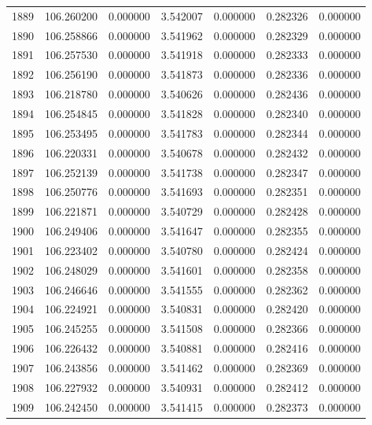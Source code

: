 \begin{tabular}{rrrrrrr}
1889 & 106.260200 &    0.000000 &  3.542007 &    0.000000 &    0.282326 &  0.000000 \\
1890 & 106.258866 &    0.000000 &  3.541962 &    0.000000 &    0.282329 &  0.000000 \\
1891 & 106.257530 &    0.000000 &  3.541918 &    0.000000 &    0.282333 &  0.000000 \\
1892 & 106.256190 &    0.000000 &  3.541873 &    0.000000 &    0.282336 &  0.000000 \\
1893 & 106.218780 &    0.000000 &  3.540626 &    0.000000 &    0.282436 &  0.000000 \\
1894 & 106.254845 &    0.000000 &  3.541828 &    0.000000 &    0.282340 &  0.000000 \\
1895 & 106.253495 &    0.000000 &  3.541783 &    0.000000 &    0.282344 &  0.000000 \\
1896 & 106.220331 &    0.000000 &  3.540678 &    0.000000 &    0.282432 &  0.000000 \\
1897 & 106.252139 &    0.000000 &  3.541738 &    0.000000 &    0.282347 &  0.000000 \\
1898 & 106.250776 &    0.000000 &  3.541693 &    0.000000 &    0.282351 &  0.000000 \\
1899 & 106.221871 &    0.000000 &  3.540729 &    0.000000 &    0.282428 &  0.000000 \\
1900 & 106.249406 &    0.000000 &  3.541647 &    0.000000 &    0.282355 &  0.000000 \\
1901 & 106.223402 &    0.000000 &  3.540780 &    0.000000 &    0.282424 &  0.000000 \\
1902 & 106.248029 &    0.000000 &  3.541601 &    0.000000 &    0.282358 &  0.000000 \\
1903 & 106.246646 &    0.000000 &  3.541555 &    0.000000 &    0.282362 &  0.000000 \\
1904 & 106.224921 &    0.000000 &  3.540831 &    0.000000 &    0.282420 &  0.000000 \\
1905 & 106.245255 &    0.000000 &  3.541508 &    0.000000 &    0.282366 &  0.000000 \\
1906 & 106.226432 &    0.000000 &  3.540881 &    0.000000 &    0.282416 &  0.000000 \\
1907 & 106.243856 &    0.000000 &  3.541462 &    0.000000 &    0.282369 &  0.000000 \\
1908 & 106.227932 &    0.000000 &  3.540931 &    0.000000 &    0.282412 &  0.000000 \\
1909 & 106.242450 &    0.000000 &  3.541415 &    0.000000 &    0.282373 &  0.000000 \\

\end{tabular}
